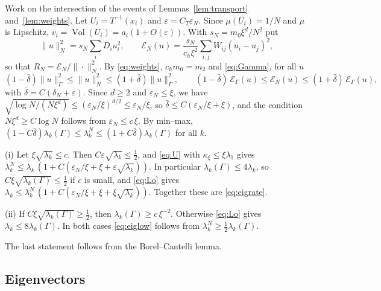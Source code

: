 \documentclass[11pt,a4paper]{article}
\makeatletter
\theoremstyle{stmt}
\theoremstyle{defn}
\theoremstyle{rmk}
\renewenvironment{proof}[1][\proofname]{\par\pushQED{\qed}\normalfont\topsep6\p@\@plus6\p@\relax
  \trivlist\item[\hskip\labelsep{\sffamily\itshape\small #1.}]\ignorespaces}{\popQED\endtrivlist\@endpefalse}
\numberwithin{equation}{section}
\DeclareMathOperator{\Vol}{Vol}
\makeatother
\begin{document}
\begin{proof}[Proof of Theorem~\ref{thm:eig}]
Work on the intersection of the events of Lemmas~\ref{lem:transport} and~\ref{lem:weights}. Let $U_i=T^{-1}(x_i)$ and $\varepsilon=C_T\varepsilon_N$. Since $\mu(U_i)=1/N$ and $\mu$ is Lipschitz, $v_i=\Vol(U_i)=a_i(1+O(\varepsilon))$. With $s_N=m_0\xi^d/N^2$ put
\begin{equation}\label{eq:Nforms}
\|u\|_N^2=s_N\sum_iD_iu_i^2,\qquad \mathcal E_N(u)=\frac{s_N}{c_h\xi^2}\sum_{i,j}W_{ij}(u_i-u_j)^2,
\end{equation}
so that $R_N=\mathcal E_N/\|\cdot\|_N^2$. By \eqref{eq:weights}, $c_hm_0=m_2$ and \eqref{eq:Gamma}, for all $u$
\begin{equation}\label{eq:twosided}
(1-\bar\delta)\|u\|_\Gamma^2\le\|u\|_N^2\le(1+\bar\delta)\|u\|_\Gamma^2,\qquad(1-\bar\delta)\,\mathcal E_\Gamma(u)\le\mathcal E_N(u)\le(1+\bar\delta)\,\mathcal E_\Gamma(u),
\end{equation}
with $\bar\delta=C(\delta_N+\varepsilon)$. Since $d\ge2$ and $\varepsilon_N\le\xi$, we have $\sqrt{\log N/(N\xi^d)}\le(\varepsilon_N/\xi)^{d/2}\le\varepsilon_N/\xi$, so $\bar\delta\le C(\varepsilon_N/\xi+\xi)$, and the condition $N\xi^d\ge C\log N$ follows from $\varepsilon_N\le c\,\xi$. By min--max, $(1-C\bar\delta)\lambda_k(\Gamma)\le\lambda_k^N\le(1+C\bar\delta)\lambda_k(\Gamma)$ for all $k$.

(i) Let $\xi\sqrt{\lambda_k}\le c$. Then $C\varepsilon\sqrt{\lambda_k}\le\tfrac12$, and \eqref{eq:U} with $\kappa_\xi\le\xi\lambda_1$ gives $\lambda_k^N\le\lambda_k\,(1+C(\varepsilon_N/\xi+\xi+\varepsilon\sqrt{\lambda_k}))$. In particular $\lambda_k(\Gamma)\le4\lambda_k$, so $C\xi\sqrt{\lambda_k(\Gamma)}\le\tfrac12$ if $c$ is small, and \eqref{eq:Lo} gives $\lambda_k\le\lambda_k^N\,(1+C(\varepsilon_N/\xi+\xi+\xi\sqrt{\lambda_k}))$. Together these are \eqref{eq:eigrate}.

(ii) If $C\xi\sqrt{\lambda_k(\Gamma)}\ge\tfrac12$, then $\lambda_k(\Gamma)\ge c\,\xi^{-2}$. Otherwise \eqref{eq:Lo} gives $\lambda_k\le8\lambda_k(\Gamma)$. In both cases \eqref{eq:eiglow} follows from $\lambda_k^N\ge\tfrac12\lambda_k(\Gamma)$.

The last statement follows from the Borel--Cantelli lemma.
\end{proof}

\subsection{Eigenvectors}
\end{document}
